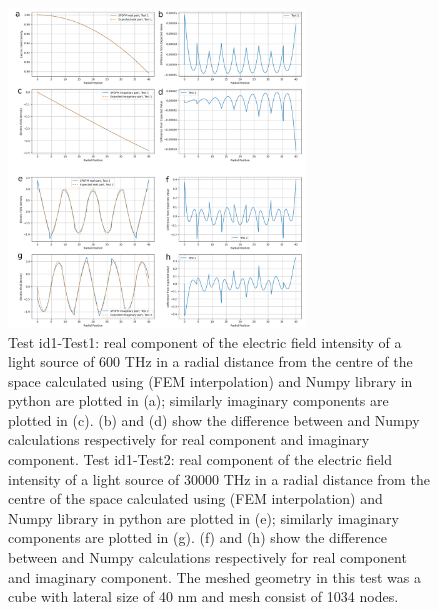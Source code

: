 \documentclass[12pt, titlepage]{article}
\begin{document}
\begin{enumerate}
	 \begin{figure} \centering \includegraphics[width=0.7\textwidth]{R3-test1-test1-2.png} 
	 	\caption{Test id1-Test1: real component of the electric field intensity of a light source of 600 THz in a radial distance from the centre of the space calculated using \progname{} (FEM interpolation) and Numpy library in python are plotted in (a); similarly imaginary components are plotted in (c). (b) and (d) show the difference between \progname{} and Numpy calculations respectively for real component and imaginary component. Test id1-Test2: real component of the electric field intensity of a light source of 30000 THz in a radial distance from the centre of the space calculated using \progname{} (FEM interpolation) and Numpy library in python are plotted in (e); similarly imaginary components are plotted in (g). (f) and (h) show the difference between \progname{} and Numpy calculations respectively for real component and imaginary component. The meshed geometry in this test was a cube with lateral size of 40 nm and mesh consist of 1034 nodes.} \label{test1tes1-2} 
   	\end{figure}
   

\end{enumerate}
\end{document}
